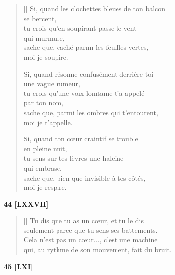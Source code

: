 \documentclass[a4paper,12pt]{book}
\begin{document}
\begin{verse}[\versewidth]
  Si, quand les clochettes bleues de ton balcon \\
  se bercent, \\
  tu crois qu'en soupirant passe le vent \\
  qui murmure, \\
  sache que, caché parmi les feuilles vertes, \\
  moi je soupire.

  Si, quand résonne confusément derrière toi \\
  une vague rumeur, \\
  tu crois qu'une voix lointaine t'a appelé \\
  par ton nom, \\
  sache que, parmi les ombres qui t'entourent, \\
  moi je t'appelle.

  Si, quand ton cœur craintif se trouble \\
  en pleine nuit, \\
  tu sens sur tes lèvres une haleine \\
  qui embrase, \\
  sache que, bien que invisible à tes côtés, \\
  moi je respire.
\end{verse}

\bigskip

\begin{center}
  \textbf{44 [LXXVII]}
   \end{center}

\settowidth{\versewidth}{qui, au rythme de son mouvement, fait du bruit.}

\begin{verse}[\versewidth]
  Tu dis que tu as un cœur, et tu le dis \\
  seulement parce que tu sens ses battements. \\
  Cela n'est pas un cœur..., c'est une machine \\
  qui, au rythme de son mouvement, fait du bruit.
\end{verse}

\bigskip

\begin{center}
  \textbf{45 [LXI]}
\end{center}
\end{document}
